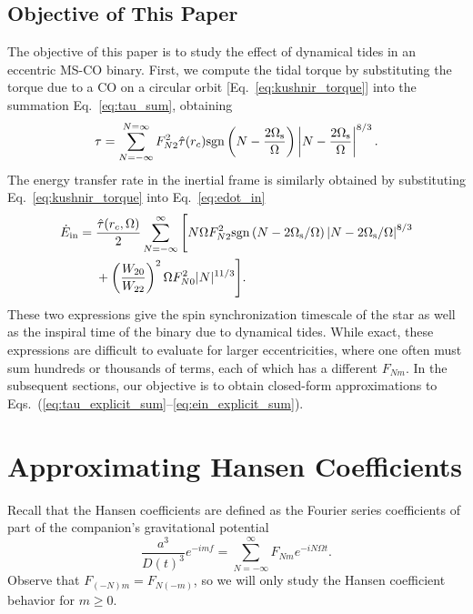 \documentclass[
        fleqn,
        usenatbib,
    ]{mnras}
\begin{document}
\subsection{Objective of This Paper}\label{ss:objective}

The objective of this paper is to study the effect of dynamical tides in an
eccentric MS-CO binary. First, we compute the tidal torque by substituting the
torque due to a CO on a circular orbit [Eq.~\eqref{eq:kushnir_torque}] into the
summation Eq.~\eqref{eq:tau_sum}, obtaining
\begin{equation}
    \tau = \sum_{N = -\infty}^{N = \infty} F_{N2}^2 \hat{\tau}(r_c)
        \mathrm{sgn}\left(N - \frac{2\Omega_{\rm s}}{ \Omega}\right) \left|N - \frac{2
        \Omega_{\rm s}}{\Omega}\right|^{8/3}.\label{eq:tau_explicit_sum}
\end{equation}
The energy transfer rate in the inertial frame is similarly obtained by
substituting Eq.~\eqref{eq:kushnir_torque} into Eq.~\eqref{eq:edot_in}
\begin{align}
    \dot{E}_{\rm in} ={}& \frac{\hat{\tau}(r_c, \Omega)}{2}
        \sum_{N = -\infty}^{\infty} \Bigg[
            N\Omega F_{N2}^2 \mathrm{sgn}\left(N - 2\Omega_{\rm s} / \Omega\right)
                    \left|N - 2 \Omega_{\rm s} / \Omega\right|^{8/3}\nonumber\\
            &+ \left(\frac{W_{20}}{W_{22}}\right)^2 \Omega
                    F_{N0}^2 |N|^{11/3}
            \Bigg].\label{eq:ein_explicit_sum}
\end{align}
These two expressions give the spin synchronization timescale of the star as
well as the inspiral time of the binary due to dynamical tides. While exact,
these expressions are difficult to evaluate for larger eccentricities, where one
often must sum hundreds or thousands of terms, each of which has a different
$F_{Nm}$. In the subsequent sections, our objective is to obtain closed-form
approximations to Eqs.~(\ref{eq:tau_explicit_sum}--\ref{eq:ein_explicit_sum}).

\section{Approximating Hansen Coefficients}\label{s:hansens}

Recall that the Hansen coefficients are defined as the Fourier series
coefficients of part of the companion's gravitational potential
\begin{equation}
    \frac{a^3}{D(t)^3} e^{-imf} = \sum\limits_{N = -\infty}^\infty
        F_{Nm} e^{-iN\Omega t}.\label{eq:hansen_series}
\end{equation}
Observe that $F_{(-N)m} = F_{N(-m)}$, so we will only study the Hansen
coefficient behavior for $m \geq 0$.
\end{document}
